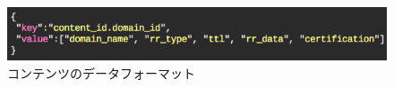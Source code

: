 \begin{figure}[h]
 \centering
 \includegraphics[scale=0.6]{figure/content-file.png}
 \caption{コンテンツのデータフォーマット}
 \label{fig:manager-provider}
\end{figure}

%
